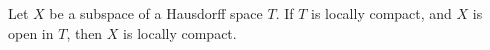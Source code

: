 Let $X$ be a subspace of a Hausdorff space $T$. If $T$ is locally compact, and $X$ is open in $T$, then $X$ is locally compact.
